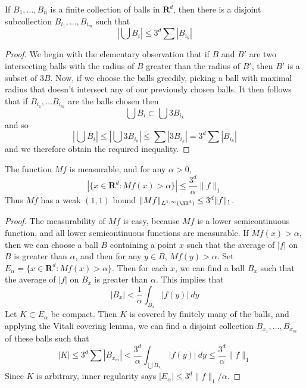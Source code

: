\begin{lemma}
    If $B_1, \dots, B_n$ is a finite collection of balls in $\mathbf{R}^d$, then there is a disjoint subcollection $B_{i_1}, \dots, B_{i_m}$ such that
    \[ \left| \bigcup B_i \right| \leq 3^d \sum |B_{i_k}| \]
\end{lemma}
\begin{proof}
    We begin with the elementary observation that if $B$ and $B'$ are two intersecting balls with the radius of $B$ greater than the radius of $B'$, then $B'$ is a subset of $3B$. Now, if we choose the balls greedily, picking a ball with maximal radius that doesn't intersect any of our previously chosen balls. It then follows that if $B_{i_1}, \dots B_{i_m}$ are the balls chosen then
    \[ \bigcup B_i \subset \bigcup 3B_{i_k} \]
    and so
    \[ \left| \bigcup B_i \right| \leq \left| \bigcup 3B_{i_k} \right| \leq \sum |3B_{i_k}| = 3^d \sum |B_{i_k}| \]
    and we therefore obtain the required inequality.
\end{proof}

\begin{theorem}
    The function $Mf$ is measurable, and for any $\alpha > 0$,
    \[ |\{ x \in \mathbf{R}^d: Mf(x) > \alpha \}| \leq \frac{3^d}{\alpha} \| f \|_1 \]
    Thus $Mf$ has a weak $(1,1)$ bound $\| Mf \|_{L^{1,\infty}(\RR^d)} \leq 3^d \| f \|_1$.
\end{theorem}
\begin{proof}
    The measurability of $Mf$ is easy, because $Mf$ is a lower semicontinuous function, and all lower semicontinuous functions are measurable. If $Mf(x) > \alpha$, then we can choose a ball $B$ containing a point $x$ such that the average of $|f|$ on $B$ is greater than $\alpha$, and then for any $y \in B$, $Mf(y) > \alpha$. Set $E_\alpha = \{ x \in \mathbf{R}^d: Mf(x) > \alpha \}$. Then for each $x$, we can find a ball $B_x$ such that the average of $|f|$ on $B_x$ is greater than $\alpha$. This implies that
    \[ |B_x| < \frac{1}{\alpha} \int_{B_x} |f(y)|\ dy \]
    Let $K \subset E_\alpha$ be compact. Then $K$ is covered by finitely many of the balls, and applying the Vitali covering lemma, we can find a disjoint collection $B_{x_1}, \dots, B_{x_m}$ of these balls such that
    \[ |K| \leq 3^d \sum |B_{x_m}| < \frac{3^d}{\alpha} \int_{\bigcup B_{x_i}} |f(y)|\ dy \leq \frac{3^d}{\alpha} \|f\|_1 \]
    Since $K$ is arbitrary, inner regularity says $|E_\alpha| \leq 3^d \| f \|_1/\alpha$.
\end{proof}

